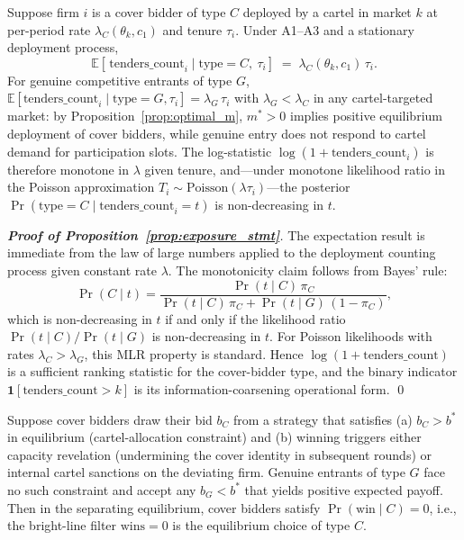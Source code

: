 \label{prop:exposure}
\label{lem:wins_zero}
\begin{proposition}\label{prop:exposure_stmt}
Suppose firm $i$ is a cover bidder of type $C$ deployed by a cartel
in market $k$ at per-period rate $\lambda_C(\theta_k, c_1)$ and
tenure $\tau_i$. Under A1--A3 and a stationary
deployment process,
\[
  \mathbb{E}\!\left[\,\text{tenders\_count}_i \mid \text{type}=C,\
                                                  \tau_i\right]
  \;=\; \lambda_C(\theta_k, c_1)\,\tau_i.
\]
For genuine competitive entrants of type $G$,
$\mathbb{E}[\text{tenders\_count}_i \mid \text{type}=G, \tau_i]
= \lambda_G\,\tau_i$ with $\lambda_G < \lambda_C$ in any
cartel-targeted market: by Proposition~\ref{prop:optimal_m},
$m^* > 0$ implies positive equilibrium deployment of cover
bidders, while genuine entry does not respond to cartel demand
for participation slots. The log-statistic
$\log(1+\text{tenders\_count}_i)$ is therefore monotone in
$\lambda$ given tenure, and---under monotone likelihood ratio
in the Poisson approximation
$T_i \sim \mathrm{Poisson}(\lambda \tau_i)$---the
posterior $\Pr(\text{type}=C \mid \text{tenders\_count}_i = t)$
is non-decreasing in $t$.
\end{proposition}

\begin{proof}[\textbf{Proof of Proposition~\ref{prop:exposure_stmt}}]
The expectation result is immediate from the law of large
numbers applied to the deployment counting process given
constant rate $\lambda$. The monotonicity claim follows from
Bayes' rule:
\[
  \Pr(C \mid t) =
  \frac{\Pr(t \mid C)\,\pi_C}{\Pr(t \mid C)\,\pi_C
                              + \Pr(t \mid G)\,(1-\pi_C)},
\]
which is non-decreasing in $t$ if and only if the likelihood
ratio $\Pr(t \mid C)/\Pr(t \mid G)$ is non-decreasing in $t$.
For Poisson likelihoods with rates $\lambda_C > \lambda_G$,
this MLR property is standard. Hence
$\log(1+\text{tenders\_count})$ is a sufficient ranking
statistic for the cover-bidder type, and the binary indicator
$\mathbf{1}[\text{tenders\_count} > k]$ is its
information-coarsening operational form. \qed
\end{proof}

\begin{lemma}\label{lem:wins_zero_stmt}
Suppose cover bidders draw their bid $b_C$ from a strategy that
satisfies (a) $b_C > b^*$ in equilibrium (cartel-allocation
constraint) and (b) winning triggers either capacity revelation
(undermining the cover identity in subsequent rounds) or
internal cartel sanctions on the deviating firm. Genuine
entrants of type $G$ face no such constraint and accept any
$b_G < b^*$ that yields positive expected payoff.
Then in the separating equilibrium, cover bidders satisfy
$\Pr(\text{win} \mid C) = 0$, i.e., the bright-line filter
$\text{wins}=0$ is the equilibrium choice of type $C$.
\end{lemma}

